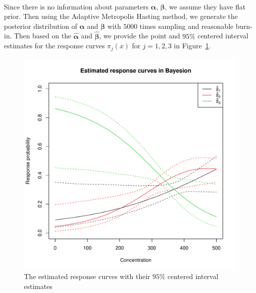 \documentclass[]{article}
\begin{document}
\begin{enumerate}
{\begin{itemize}
{\begin{eqnarray}
			\end{eqnarray}}
			Since there is no information about parameters $\bm \alpha$, $\bm \beta$, we assume they have flat prior. Then using the Adaptive Metropolis Hasting method, we generate the posterior distribution of $\bm \alpha$ and $\bm \beta$ with $5000$ times sampling and reasonable burn-in. Then based on the $\bm\hat{\alpha}$ and $\bm{\hat{\beta}}$, we provide the point and $95\%$ centered interval estimates for the response curves $\pi_j(x)$ for $j = 1,2,3$ in Figure~\ref{BERC}.
			\begin{figure}[ht!]
				\centering
				\includegraphics[scale = 0.5]{"pic/HW4_1/BERC"}
				\caption{The estimated response curves with their $95\%$ centered interval estimates}
				\label{BERC}
			\end{figure}
		\end{itemize}
		
}
\end{enumerate}
\end{document}
